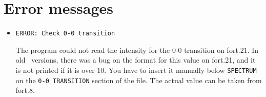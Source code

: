 \documentclass[a4paper,11pt]{article}
\begin{document}
\section{Error messages}

\begin{itemize}
 \item \texttt{ERROR: Check 0-0 transition}

The program could not read the intensity for the 0-0 transition on fort.21. In old \fcc\ versions, there was a bug on the format for this value on fort.21, and it is not printed if it is over 10. You have to insert it manually below \texttt{SPECTRUM} on the \texttt{0-0 TRANSITION} section of the file. The actual value can be taken from fort.8. 
\end{itemize}
\end{document}
